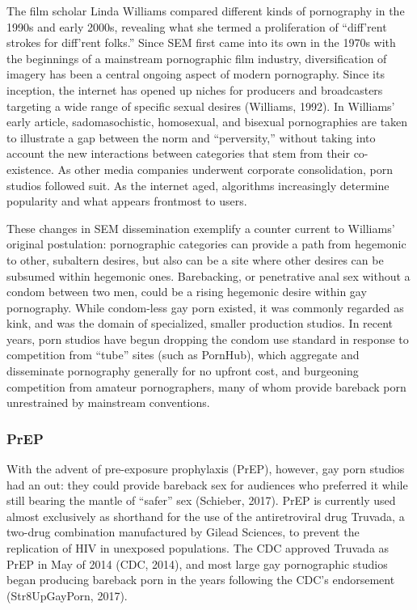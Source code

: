 \documentclass[]{article}
\begin{document}
The film scholar Linda Williams compared different kinds of pornography
in the 1990s and early 2000s, revealing what she termed a proliferation
of ``diff'rent strokes for diff'rent folks.'' Since SEM first came into
its own in the 1970s with the beginnings of a mainstream pornographic
film industry, diversification of imagery has been a central ongoing
aspect of modern pornography. Since its inception, the internet has
opened up niches for producers and broadcasters targeting a wide range
of specific sexual desires (Williams, 1992). In Williams' early article,
sadomasochistic, homosexual, and bisexual pornographies are taken to
illustrate a gap between the norm and ``perversity,'' without taking
into account the new interactions between categories that stem from
their co-existence. As other media companies underwent corporate
consolidation, porn studios followed suit. As the internet aged,
algorithms increasingly determine popularity and what appears frontmost
to users.

These changes in SEM dissemination exemplify a counter current to
Williams' original postulation: pornographic categories can provide a
path from hegemonic to other, subaltern desires, but also can be a site
where other desires can be subsumed within hegemonic ones. Barebacking,
or penetrative anal sex without a condom between two men, could be a
rising hegemonic desire within gay pornography. While condom-less gay
porn existed, it was commonly regarded as kink, and was the domain of
specialized, smaller production studios. In recent years, porn studios
have begun dropping the condom use standard in response to competition
from ``tube'' sites (such as PornHub), which aggregate and disseminate
pornography generally for no upfront cost, and burgeoning competition
from amateur pornographers, many of whom provide bareback porn
unrestrained by mainstream conventions.

\subsubsection{PrEP}\label{prep}

With the advent of pre-exposure prophylaxis (PrEP), however, gay porn
studios had an out: they could provide bareback sex for audiences who
preferred it while still bearing the mantle of ``safer'' sex (Schieber,
2017). PrEP is currently used almost exclusively as shorthand for the
use of the antiretroviral drug Truvada, a two-drug combination
manufactured by Gilead Sciences, to prevent the replication of HIV in
unexposed populations. The CDC approved Truvada as PrEP in May of 2014
(CDC, 2014), and most large gay pornographic studios began producing
bareback porn in the years following the CDC's endorsement
(Str8UpGayPorn, 2017).
\end{document}
